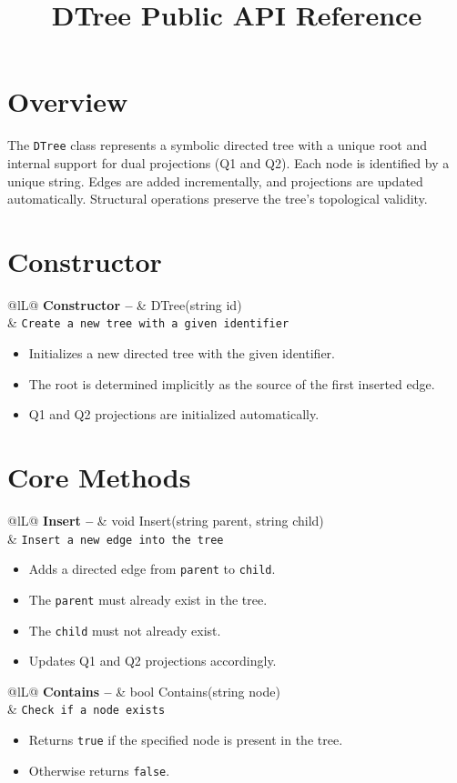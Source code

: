 \documentclass[11pt]{article}
\title{DTree Public API Reference}
\author{}
\date{}
\makeatletter
\newcommand{\apimethod}[3]{%
	\noindent\begin{tabularx}{\textwidth}{@{}lL@{}}
		\textbf{#1 -- } & #3 \\
		& \texttt{#2} \\
	\end{tabularx}
	\vspace{-0.3\baselineskip}
	\begin{itemize}[leftmargin=2em, label=--]%
	}
\makeatother
\begin{document}
		\maketitle
		
		\section*{Overview}
		
		The \texttt{DTree} class represents a symbolic directed tree with a unique root and internal support for dual projections (Q1 and Q2). Each node is identified by a unique string. Edges are added incrementally, and projections are updated automatically. Structural operations preserve the tree’s topological validity.
		
		\section*{Constructor}
		
		\apimethod{Constructor}{Create a new tree with a given identifier}{DTree(string id)}
		\item Initializes a new directed tree with the given identifier.
		\item The root is determined implicitly as the source of the first inserted edge.
		\item Q1 and Q2 projections are initialized automatically.
	\end{itemize}
	
	\section*{Core Methods}
	
	\apimethod{Insert}{Insert a new edge into the tree}{void Insert(string parent, string child)}
	\item Adds a directed edge from \texttt{parent} to \texttt{child}.
	\item The \texttt{parent} must already exist in the tree.
	\item The \texttt{child} must not already exist.
	\item Updates Q1 and Q2 projections accordingly.
\end{itemize}

\apimethod{Contains}{Check if a node exists}{bool Contains(string node)}
\item Returns \texttt{true} if the specified node is present in the tree.
\item Otherwise returns \texttt{false}.
\end{itemize}
\end{document}
